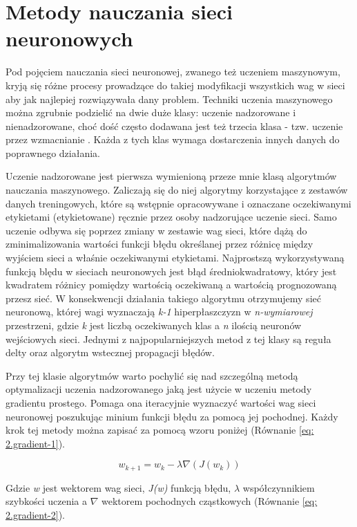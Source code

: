 \documentclass[12pt, oneside, a4paper]{report}
\begin{document}
\section{Metody nauczania sieci neuronowych}

Pod pojęciem nauczania sieci neuronowej, zwanego też uczeniem maszynowym, kryją się różne procesy prowadzące do takiej modyfikacji wszystkich wag w sieci aby jak najlepiej rozwiązywała dany problem. Techniki uczenia maszynowego można zgrubnie podzielić na dwie duże klasy: uczenie nadzorowane i nienadzorowane, choć dość często dodawana jest też trzecia klasa - tzw. uczenie przez wzmacnianie \citep{roelants2017deeplearning}. Każda z tych klas wymaga dostarczenia innych danych do poprawnego działania.

Uczenie nadzorowane jest pierwsza wymienioną przeze mnie klasą algorytmów nauczania maszynowego. Zaliczają się do niej algorytmy korzystające z zestawów danych treningowych, które są wstępnie opracowywane i oznaczane oczekiwanymi etykietami (etykietowane) ręcznie przez osoby nadzorujące uczenie sieci. Samo uczenie odbywa się poprzez zmiany w zestawie wag sieci, które dążą do zminimalizowania wartości funkcji błędu określanej przez różnicę między wyjściem sieci a właśnie oczekiwanymi etykietami. Najprostszą wykorzystywaną funkcją blędu w sieciach neuronowych jest błąd średniokwadratowy, który jest kwadratem różnicy pomiędzy wartością oczekiwaną a wartością prognozowaną przesz sieć. W konsekwencji działania takiego algorytmu otrzymujemy sieć neuronową, której wagi wyznaczają \textit{k-1} hiperpłaszczyzn w \textit{n-wymiarowej} przestrzeni, gdzie \textit{k} jest liczbą oczekiwanych klas a \textit{n} ilością neuronów wejściowych sieci. Jednymi z najpopularniejszych metod z tej klasy są reguła delty oraz algorytm wstecznej propagacji błędów.

Przy tej klasie algorytmów warto pochylić się nad szczególną metodą optymalizacji uczenia nadzorowanego jaką jest użycie w uczeniu metody gradientu prostego. Pomaga ona iteracyjnie wyznaczyć wartości wag sieci neuronowej poszukując minium funkcji błędu za pomocą jej pochodnej. Każdy krok tej metody można zapisać za pomocą wzoru poniżej (Równanie \ref{eq: 2.gradient-1}).

\begin{equation}\label{eq: 2.gradient-1}
	w_{k+1} = w_k - \lambda \nabla (J(w_k))
\end{equation}

Gdzie \textit{w} jest wektorem wag sieci, \textit{J(w)} funkcją błędu, $\lambda$ współczynnikiem szybkości uczenia a $\nabla$ wektorem pochodnych cząstkowych (Równanie \ref{eq: 2.gradient-2}).
\end{document}
